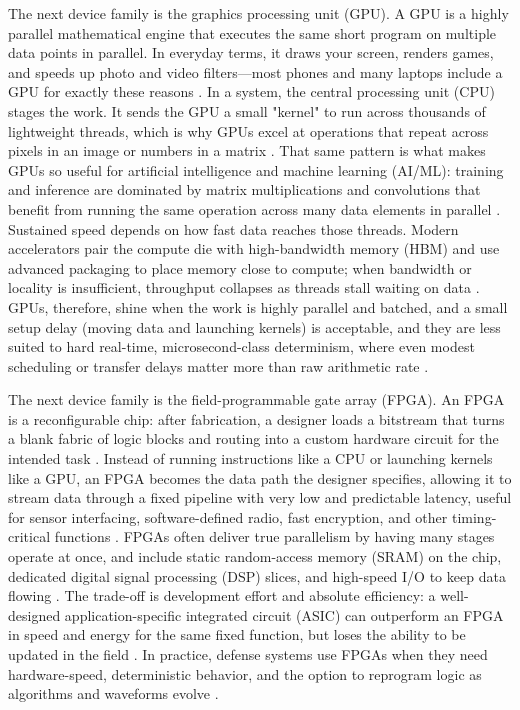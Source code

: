 The next device family is the graphics processing unit (GPU). A GPU is a highly parallel mathematical engine that executes the same short program on multiple data points in parallel. In everyday terms, it draws your screen, renders games, and speeds up photo and video filters---most phones and many laptops include a GPU for exactly these reasons \parencite{nickolls_gpu_2010}. In a system, the central processing unit (CPU) stages the work. It sends the GPU a small "kernel" to run across thousands of lightweight threads, which is why GPUs excel at operations that repeat across pixels in an image or numbers in a matrix \parencite{nickolls_gpu_2010, nickolls_scalable_2008}. That same pattern is what makes GPUs so useful for artificial intelligence and machine learning (AI/ML): training and inference are dominated by matrix multiplications and convolutions that benefit from running the same operation across many data elements in parallel \parencite{ieee_electronics_packaging_society_heterogeneous_2024,nickolls_gpu_2010}. Sustained speed depends on how fast data reaches those threads. Modern accelerators pair the compute die with high-bandwidth memory (HBM) and use advanced packaging to place memory close to compute; when bandwidth or locality is insufficient, throughput collapses as threads stall waiting on data \parencite{ieee_electronics_packaging_society_heterogeneous_2024,jacob_memory_2008}. GPUs, therefore, shine when the work is highly parallel and batched, and a small setup delay (moving data and launching kernels) is acceptable, and they are less suited to hard real-time, microsecond-class determinism, where even modest scheduling or transfer delays matter more than raw arithmetic rate \parencite{patterson_computer_2018,nickolls_gpu_2010}.

The next device family is the field-programmable gate array (FPGA). An FPGA is a reconfigurable chip: after fabrication, a designer loads a bitstream that turns a blank fabric of logic blocks and routing into a custom hardware circuit for the intended task \parencite{hauck_reconfigurable_2008}. Instead of running instructions like a CPU or launching kernels like a GPU, an FPGA becomes the data path the designer specifies, allowing it to stream data through a fixed pipeline with very low and predictable latency, useful for sensor interfacing, software-defined radio, fast encryption, and other timing-critical functions \parencite{hauck_reconfigurable_2008}. FPGAs often deliver true parallelism by having many stages operate at once, and include static random-access memory (SRAM) on the chip, dedicated digital signal processing (DSP) slices, and high-speed I/O to keep data flowing \parencite{hauck_reconfigurable_2008}. The trade-off is development effort and absolute efficiency: a well-designed application-specific integrated circuit (ASIC) can outperform an FPGA in speed and energy for the same fixed function, but loses the ability to be updated in the field \parencite{kuon_measuring_2006}. In practice, defense systems use FPGAs when they need hardware-speed, deterministic behavior, and the option to reprogram logic as algorithms and waveforms evolve \parencite{hauck_reconfigurable_2008}.

